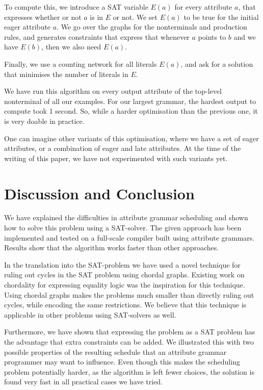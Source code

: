\documentclass{llncs}
\begin{document}
To compute this, we introduce a SAT variable $E(a)$ for every attribute $a$, that expresses whether or not $a$ is in $E$ or not. We set $E(a)$ to be true for the initial eager attribute $a$. We go over the graphs for the nonterminals and production rules, and generates constraints that express that whenever $a$ points to $b$ and we have $E(b)$, then we also need $E(a)$.

Finally, we use a counting network for all literals $E(a)$, and ask for a solution that minimises the number of literals in $E$.

We have run this algorithm on every output attribute of the top-level nonterminal of all our examples. For our largest grammar, the hardest output to compute took 1 second. So, while a harder optimisation than the previous one, it is very doable in practice.

One can imagine other variants of this optimisation, where we have a set of eager attributes, or a combination of eager and late attributes. At the time of the writing of this paper, we have not experimented with such variants yet.

\section{Discussion and Conclusion} \label{sect:conclusion}
We have explained the difficulties in attribute grammar scheduling and shown how to solve this problem using a SAT-solver. The given approach has been implemented and tested on a full-scale compiler built using attribute grammars. Results show that the algorithm works faster than other approaches.

In the translation into the SAT-problem we have used a novel technique for ruling out cycles in the SAT problem using chordal graphs. Existing work on chordality for expressing equality logic \cite{bryant-chordal} was the inspiration for this technique. Using chordal graphs makes the problems much smaller than directly ruling out cycles, while encoding the same restrictions. We believe that this technique is applicable in other problems using SAT-solvers as well.

Furthermore, we have shown that expressing the problem as a SAT problem has the advantage that extra constraints can be added. We illustrated this with two possible properties of the resulting schedule that an attribute grammar programmer may want to influence. Even though this makes the scheduling problem potentially harder, as the algorithm is left fewer choices, the solution is found very fast in all practical cases we have tried.
\end{document}

